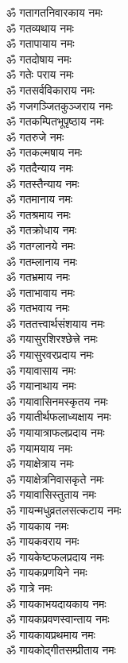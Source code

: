 \begin{multicols}{2}
\begin{flushleft}
ॐ गतागतनिवारकाय नमः\\
ॐ गतव्यथाय नमः\\
ॐ गतापायाय नमः\\
ॐ गतदोषाय नमः\\
ॐ गतेः पराय नमः\hfill{}\\
ॐ गतसर्वविकाराय नमः\\
ॐ गजगञ्जितकुञ्जराय नमः\\
ॐ गतकम्पितभूपृष्ठाय नमः\\
ॐ गतरुजे नमः\\
ॐ गतकल्मषाय नमः\\
ॐ गतदैन्याय नमः\\
ॐ गतस्तैन्याय नमः\\
ॐ गतमानाय नमः\\
ॐ गतश्रमाय नमः\\
ॐ गतक्रोधाय नमः\hfill{}\\
ॐ गतग्लानये नमः\\
ॐ गतम्लानाय नमः\\
ॐ गतभ्रमाय नमः\\
ॐ गताभावाय नमः\\
ॐ गतभवाय नमः\\
ॐ गततत्त्वार्थसंशयाय नमः\\
ॐ गयासुरशिरश्छेत्त्रे नमः\\
ॐ गयासुरवरप्रदाय नमः\\
ॐ गयावासाय नमः\\
ॐ गयानाथाय नमः\hfill{}\\
ॐ गयावासिनमस्कृतय नमः\\
ॐ गयातीर्थफलाध्यक्षाय नमः\\
ॐ गयायात्राफलप्रदाय नमः\\
ॐ गयामयाय नमः\\
ॐ गयाक्षेत्राय नमः\\
ॐ गयाक्षेत्रनिवासकृते नमः\\
ॐ गयावासिस्तुताय नमः\\
ॐ गायन्मधुव्रतलसत्कटाय नमः\\
ॐ गायकाय नमः\\
ॐ गायकवराय नमः\hfill{}\\
ॐ गायकेष्टफलप्रदाय नमः\\
ॐ गायकप्रणयिने नमः\\
ॐ गात्रे नमः\\
ॐ गायकाभयदायकाय नमः\\
ॐ गायकप्रवणस्वान्ताय नमः\\
ॐ गायकायप्रथमाय नमः\\
ॐ गायकोद्गीतसम्प्रीताय नमः\\

\end{flushleft}
\end{multicols}
